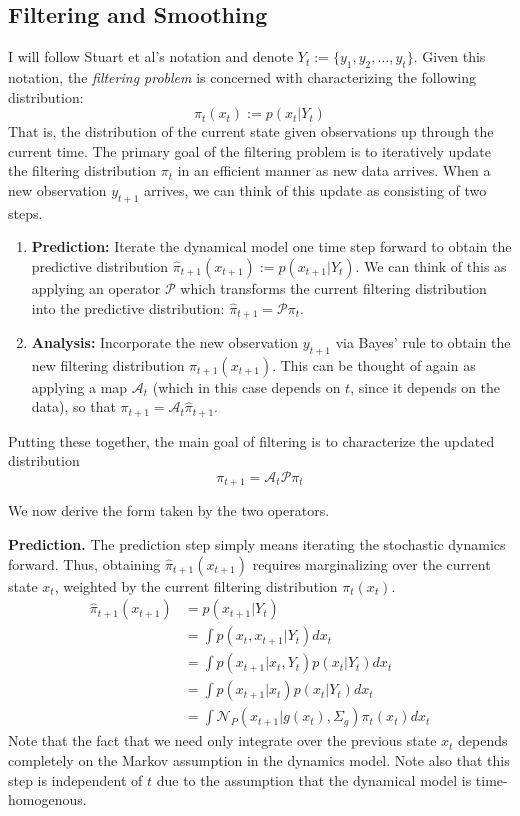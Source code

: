 \documentclass[12pt]{article}
\begin{document}
\subsection{Filtering and Smoothing}
I will follow Stuart et al's notation and denote $Y_t := \{y_1, y_2, \dots, y_t\}$. Given this notation, the \textit{filtering problem} is concerned with characterizing the following distribution:
\[\pi_{t}(x_t) := p(x_t|Y_t)\]
That is, the distribution of the current state given observations up through the current time. The primary goal of the filtering problem is to iteratively update the filtering distribution $\pi_t$ in 
an efficient manner as new data arrives. When a new observation $y_{t + 1}$ arrives, we can think of this update as consisting of two steps. 
\begin{enumerate}
\item \textbf{Prediction:} Iterate the dynamical model one time step forward to obtain the predictive distribution $\hat{\pi}_{t+1}(x_{t+1}) := p(x_{t+1}|Y_t)$. We can think of this as applying 
an operator $\mathcal{P}$ which transforms the current filtering distribution into the predictive distribution: $\hat{\pi}_{t+1} = \mathcal{P}\pi_t$. 
\item \textbf{Analysis:} Incorporate the new observation $y_{t+1}$ via Bayes' rule to obtain the new filtering distribution $\pi_{t+1}(x_{t+1})$. This can be thought of again as 
applying a map $\mathcal{A}_t$ (which in this case depends on $t$, since it depends on the data), so that $\pi_{t + 1} = \mathcal{A}_t \hat{\pi}_{t+1}$. 
\end{enumerate}
Putting these together, the main goal of filtering is to characterize the updated distribution 
\[\pi_{t + 1} = \mathcal{A}_t \mathcal{P} \pi_t \]

We now derive the form taken by the two operators. 

\bigskip
\noindent
\textbf{Prediction.} The prediction step simply means iterating the stochastic dynamics forward. Thus, obtaining $\hat{\pi}_{t+1}(x_{t+1})$ requires marginalizing 
over the current state $x_t$, weighted by the current filtering distribution $\pi_t(x_t)$. 
\begin{align*}
\hat{\pi}_{t+1}(x_{t+1}) &= p(x_{t+1}|Y_t) \\
				   &= \int p(x_t, x_{t+1}|Y_t) dx_t \\ 
				   &= \int p(x_{t+1}|x_t, Y_t) p(x_t|Y_t) dx_t \\
				   &= \int p(x_{t+1}|x_t) p(x_t|Y_t) dx_t \\
				   &= \int \mathcal{N}_P(x_{t+1}|g(x_t), \Sigma_g) \pi_t(x_t) dx_t
\end{align*}
Note that the fact that we need only integrate over the previous state $x_t$ depends completely on the Markov assumption in the dynamics model. Note also that this 
step is independent of $t$ due to the assumption that the dynamical model is time-homogenous. 
\end{document}

